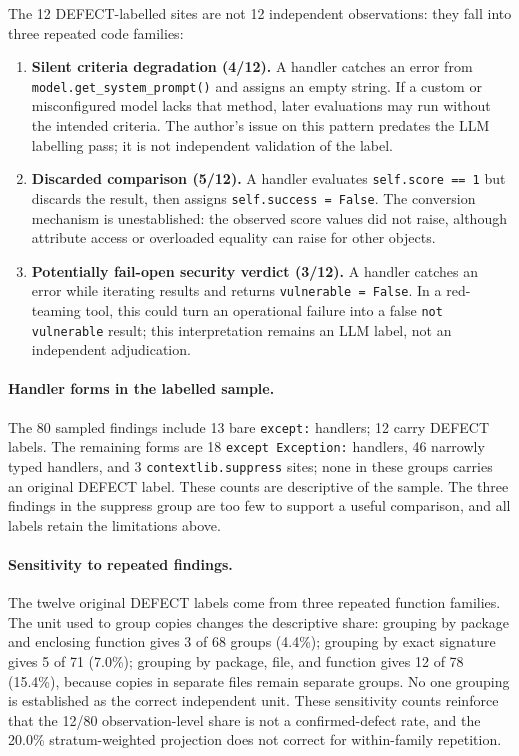 \documentclass[10pt,a4paper]{article}
\begin{document}
The 12 DEFECT-labelled sites are not 12 independent observations: they fall
into three repeated code families:
\begin{enumerate}[nosep,leftmargin=*]
\item \textbf{Silent criteria degradation (4/12).} A handler catches an error
from \texttt{model.get\_system\_}\allowbreak\texttt{prompt()} and assigns an empty string. If a
custom or misconfigured model lacks that method, later evaluations may run
without the intended criteria. The author's issue on this pattern predates the
LLM labelling pass; it is not independent validation of the label.
\item \textbf{Discarded comparison (5/12).} A handler evaluates
\texttt{self.score == 1} but discards the result, then assigns
\texttt{self.success = False}. The conversion mechanism is unestablished: the
observed score values did not raise, although attribute access or overloaded
equality can raise for other objects.
\item \textbf{Potentially fail-open security verdict (3/12).} A handler catches
an error while iterating results and returns \texttt{vulnerable = False}. In a
red-teaming tool, this could turn an operational failure into a false
\texttt{not vulnerable} result; this interpretation remains an LLM label, not
an independent adjudication.
\end{enumerate}

\paragraph{Handler forms in the labelled sample.}
The 80 sampled findings include 13 bare \texttt{except:} handlers; 12 carry
DEFECT labels. The remaining forms are 18 \texttt{except Exception:}
handlers, 46 narrowly typed handlers, and 3 \texttt{contextlib.suppress}
sites; none in these groups carries an original DEFECT label. These counts are
descriptive of the sample. The three findings in the suppress group are too few
to support a useful comparison, and all labels retain the limitations above.

\paragraph{Sensitivity to repeated findings.}
The twelve original DEFECT labels come from three repeated function families.
The unit used to group copies changes the descriptive share: grouping by package
and enclosing function gives 3 of 68 groups (4.4\%); grouping by exact
signature gives 5 of 71 (7.0\%); grouping by package, file, and function gives
12 of 78 (15.4\%), because copies in separate files remain separate groups.
No one grouping is established as the correct independent unit. These
sensitivity counts reinforce that the 12/80 observation-level share is not a
confirmed-defect rate, and the 20.0\% stratum-weighted projection does not
correct for within-family repetition.
\end{document}
